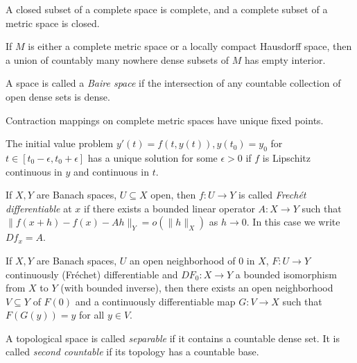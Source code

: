 \documentclass[letterpaper,11pt]{report}
\begin{document}
\begin{prop} A closed subset of a complete space is complete, and a complete subset of a metric space is closed.
\end{prop}

\begin{thm} If $M$ is either a complete metric space or a locally compact Hausdorff space, then a union of countably many nowhere dense subsets of $M$ has empty interior.
\end{thm}

\begin{defn} A space is called a \emph{Baire space} if the intersection of any countable collection of open dense sets is dense.
\end{defn}

\begin{thm} Contraction mappings on complete metric spaces have unique fixed points.
\end{thm}

\begin{cor} The initial value problem $y'(t) = f(t,y(t)), y(t_0) = y_0$ for $t \in [t_0-\epsilon,t_0+\epsilon]$ has a unique solution for some $\epsilon > 0$ if $f$ is Lipschitz continuous in $y$ and continuous in $t$.
\end{cor}

\begin{defn} If $X,Y$ are Banach spaces, $U \subseteq X$ open, then $f:U\rightarrow Y$ is called \emph{Frech\'et differentiable} at $x$ if there exists a bounded linear operator $A:X\rightarrow Y$ such that $\|f(x+h) - f(x) - Ah\|_Y = o(\|h\|_X)$ as $h \rightarrow 0$. In this case we write $Df_x = A$.
\end{defn}

\begin{cor} If $X,Y$ are Banach spaces, $U$ an open neighborhood of $0$ in $X$, $F:U\rightarrow Y$ continuously (Fr\'echet) differentiable and $DF_0:X\rightarrow Y$ a bounded isomorphism from $X$ to $Y$ (with bounded inverse), then there exists an open neighborhood $V \subseteq Y$ of $F(0)$ and a continuously differentiable map $G:V\rightarrow X$ such that $F(G(y)) = y$ for all $y \in V$.
\end{cor}

\begin{defn} A topological space is called \emph{separable} if it contains a countable dense set. It is called \emph{second countable} if its topology has a countable base.
\end{defn}
\end{document}
